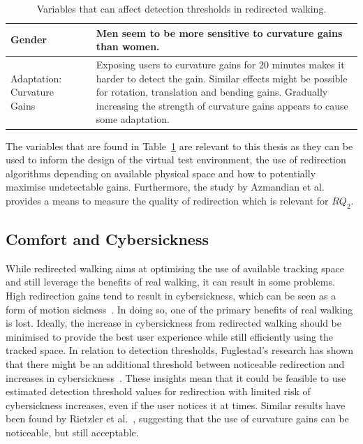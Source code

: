 \begin{table}[!h]
\begin{tabularx}{\textwidth}{|m{2cm}|m{1.7cm}|m{10.1cm}|}
\hline
Gender & \cite{nguyen2018individual} & Men seem to be more sensitive to curvature gains than women.\\
\hline
Adaptation: Curvature Gains & \cite{5072212, bolling2019shrinking, grechkin2016revisiting} & Exposing users to curvature gains for 20 minutes makes it harder to detect the gain. Similar effects might be possible for rotation, translation and bending gains. Gradually increasing the strength of curvature gains appears to cause some adaptation.\\
\hline
\end{tabularx}
\caption[Variables That Can Affect Detection Thresholds in Redirected Walking]{Variables that can affect detection thresholds in redirected walking.}
\label{table:DTVariables}
\end{table}

The variables that are found in Table~\ref{table:DTVariables} are relevant to this thesis as they can be used to inform the design of the virtual test environment, the use of redirection algorithms depending on available physical space and how to potentially maximise undetectable gains. Furthermore, the study by Azmandian et al.~\cite{azmandian2015physical} provides a means to measure the quality of redirection which is relevant for $RQ_2$.

\subsection{Comfort and Cybersickness}
While redirected walking aims at optimising the use of available tracking space and still leverage the benefits of real walking, it can result in some problems. High redirection gains tend to result in cybersickness, which can be seen as a form of motion sickness~\cite{mousavi2013review}. In doing so, one of the primary benefits of real walking is lost. Ideally, the increase in cybersickness from redirected walking should be minimised to provide the best user experience while still efficiently using the tracked space. In relation to detection thresholds, Fuglestad's research has shown that there might be an additional threshold between noticeable redirection and increases in cybersickness~\cite{fuglestad2018redirected}. These insights mean that it could be feasible to use estimated detection threshold values for redirection with limited risk of cybersickness increases, even if the user notices it at times. Similar results have been found by Rietzler et al.~\cite{rietzler2018rethinking}, suggesting that the use of curvature gains can be noticeable, but still acceptable. 

